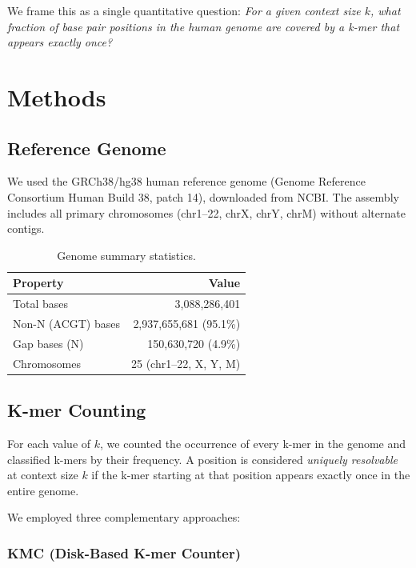 \documentclass[11pt,a4paper]{article}
\begin{document}
We frame this as a single quantitative question: \emph{For a given context size $k$, what fraction of base pair positions in the human genome are covered by a k-mer that appears exactly once?}

\section{Methods}

\subsection{Reference Genome}

We used the GRCh38/hg38 human reference genome (Genome Reference Consortium Human Build 38, patch 14), downloaded from NCBI. The assembly includes all primary chromosomes (chr1--22, chrX, chrY, chrM) without alternate contigs.

\begin{table}[H]
\centering
\caption{Genome summary statistics.}
\begin{tabular}{lr}
\toprule
\textbf{Property} & \textbf{Value} \\
\midrule
Total bases & 3,088,286,401 \\
Non-N (ACGT) bases & 2,937,655,681 (95.1\%) \\
Gap bases (N) & 150,630,720 (4.9\%) \\
Chromosomes & 25 (chr1--22, X, Y, M) \\
\bottomrule
\end{tabular}
\label{tab:genome}
\end{table}

\subsection{K-mer Counting}

For each value of $k$, we counted the occurrence of every k-mer in the genome and classified k-mers by their frequency. A position is considered \emph{uniquely resolvable} at context size $k$ if the k-mer starting at that position appears exactly once in the entire genome.

We employed three complementary approaches:

\subsubsection{KMC (Disk-Based K-mer Counter)}
\end{document}
